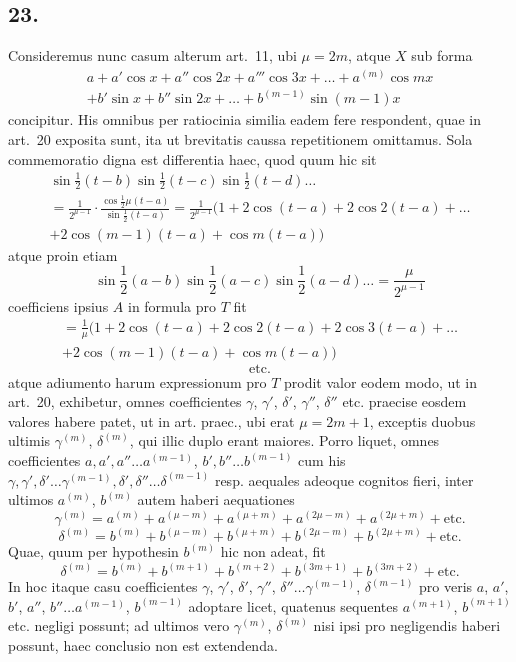 \documentclass[12pt,a4paper]{article}
\theoremstyle{plain}
\begin{document}
\subsection*{23.}

Consideremus nunc casum alterum art.\ 11, ubi $\mu = 2m$, atque $X$ sub forma
\begin{multline*}
a + a'\cos x + a''\cos 2x + a'''\cos 3x + \ldots + a^{(m)}\cos mx\\
+ b'\sin x + b''\sin 2x + \ldots + b^{(m-1)}\sin(m-1)x
\end{multline*}
concipitur. His omnibus per ratiocinia similia eadem fere respondent, quae in art.\ 20
exposita sunt, ita ut brevitatis caussa repetitionem omittamus. Sola commemoratio digna est differentia haec, quod quum hic sit
\begin{multline*}
\sin\frac{1}{2}(t-b)\sin\frac{1}{2}(t-c)\sin\frac{1}{2}(t-d)\ldots\\
= \frac{1}{2^{\mu-1}}\cdot\frac{\cos\frac{1}{2}\mu(t-a)}{\sin\frac{1}{2}(t-a)} = \frac{1}{2^{\mu-1}}(1 + 2\cos(t-a) + 2\cos 2(t-a) + \ldots\\
+ 2\cos(m-1)(t-a) + \cos m(t-a))
\end{multline*}
atque proin etiam
\[
\sin\frac{1}{2}(a-b)\sin\frac{1}{2}(a-c)\sin\frac{1}{2}(a-d)\ldots = \frac{\mu}{2^{\mu-1}}
\]
coefficiens ipsius $A$ in formula pro $T$ fit
\begin{multline*}
= \frac{1}{\mu}(1 + 2\cos(t-a) + 2\cos 2(t-a) + 2\cos 3(t-a) + \ldots\\
+ 2\cos(m-1)(t-a) + \cos m(t-a))
\end{multline*}
\[\text{etc.}\]
atque adiumento harum expressionum pro $T$ prodit valor eodem modo, ut in art.\ 20, exhibetur, omnes coefficientes $\gamma$, $\gamma'$, $\delta'$, $\gamma''$, $\delta''$ etc. praecise eosdem valores habere
patet, ut in art. praec., ubi erat $\mu = 2m+1$, exceptis duobus ultimis $\gamma^{(m)}$, $\delta^{(m)}$, qui illic duplo erant maiores. Porro liquet, omnes coefficientes $a, a', a''\ldots a^{(m-1)}$,
$b', b''\ldots b^{(m-1)}$ cum his $\gamma, \gamma', \delta'\ldots \gamma^{(m-1)}, \delta', \delta''\ldots \delta^{(m-1)}$ resp. aequales adeoque cognitos fieri, inter ultimos $a^{(m)}$, $b^{(m)}$ autem haberi aequationes
\[
\gamma^{(m)} = a^{(m)} + a^{(\mu-m)} + a^{(\mu+m)} + a^{(2\mu-m)} + a^{(2\mu+m)} + \text{etc.}
\]
\[
\delta^{(m)} = b^{(m)} + b^{(\mu-m)} + b^{(\mu+m)} + b^{(2\mu-m)} + b^{(2\mu+m)} + \text{etc.}
\]
Quae, quum per hypothesin $b^{(m)}$ hic non adeat, fit
\[
\delta^{(m)} = b^{(m)} + b^{(m+1)} + b^{(m+2)} + b^{(3m+1)} + b^{(3m+2)} + \text{etc.}
\]
In hoc itaque casu coefficientes $\gamma$, $\gamma'$, $\delta'$, $\gamma''$, $\delta''\ldots \gamma^{(m-1)}$, $\delta^{(m-1)}$ pro veris $a$, $a'$, $b'$, $a''$, $b''\ldots a^{(m-1)}$, $b^{(m-1)}$ adoptare licet, quatenus sequentes
$a^{(m+1)}$, $b^{(m+1)}$ etc. negligi possunt; ad ultimos vero $\gamma^{(m)}$, $\delta^{(m)}$ nisi ipsi pro negligendis haberi possunt, haec conclusio non est extendenda.
\end{document}
